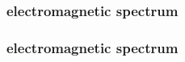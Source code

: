 \documentclass{beamer}
\begin{document}
\subsubsection{electromagnetic spectrum}


\begin{frame}
    \frametitle{electromagnetic spectrum}
    \begin{figure}
    \end{figure}
\end{frame}
\end{document}
